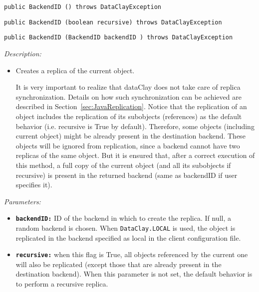 \begin{dBox}

\texttt{public BackendID () throws DataClayException}

\texttt{public BackendID (boolean recursive) throws DataClayException}

\texttt{public BackendID (BackendID backendID ) throws DataClayException}
\LINE

{\it Description:}

\begin{itemize}
    \item Creates a replica of the current object.
    
    It is very important to realize that dataClay does not take care of replica synchronization. Details on how such synchronization can be achieved are described in Section~\ref{sec:JavaReplication}.
    \newline
    \newline
    Notice that the replication of an object includes the replication of its subobjects (references) as the default behavior (i.e. recursive is True by default). Therefore, some objects (including current object) might be already present in the destination backend. These objects will be ignored from replication, since a backend cannot have two replicas of the same object. But it is ensured that, after a correct execution of this method, a full copy of the current object (and all its subobjects if recursive) is present in the returned backend (same as backendID if user specifies it).

\end{itemize}

{\it Parameters:}

\begin{itemize}
    \item \texttt{\bfseries backendID:} ID of the backend in which to create the replica. If null, a random backend is chosen. When \texttt{DataClay.LOCAL} is used, the object is replicated in the backend specified as local in the client configuration file.
    \item \texttt{\bfseries recursive:} when this flag is True, all objects referenced by the current one will also be replicated (except those that are already present in the destination backend). When this parameter is not set, the default behavior is to perform a recursive replica.
\end{itemize}


\end{dBox}
